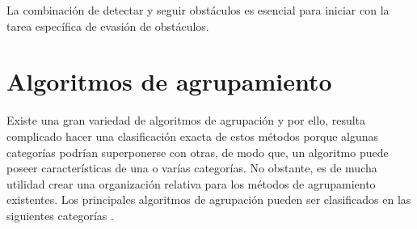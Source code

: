 La combinación de detectar y seguir obstáculos es esencial para iniciar con la tarea específica de evasión de obstáculos. 

\section{Algoritmos de agrupamiento} \label{sec:algoritmos_de_agrupamiento}

Existe una gran variedad de algoritmos de agrupación y por ello, resulta complicado hacer una clasificación exacta de estos métodos porque algunas categorías podrían superponerse con otras, de modo que, un algoritmo puede poseer características de una o varías categorías. No obstante, es de mucha utilidad crear una organización relativa para los métodos de agrupamiento existentes. Los principales algoritmos de agrupación pueden ser clasificados en las siguientes categorías \cite{han2011data}.

